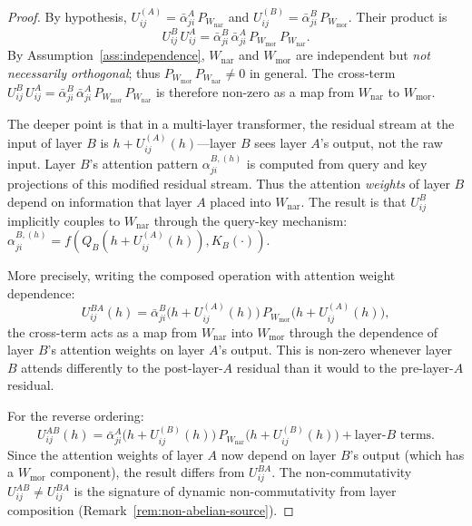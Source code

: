 \begin{proof}
By hypothesis, $U_{ij}^{(A)} = \bar{\alpha}_{ji}^{A}\, P_{W_{\mathrm{nar}}}$ and
$U_{ij}^{(B)} = \bar{\alpha}_{ji}^{B}\, P_{W_{\mathrm{mor}}}$. Their product is
\[
    U_{ij}^{B}\, U_{ij}^{A}
    = \bar{\alpha}_{ji}^{B}\, \bar{\alpha}_{ji}^{A}\, P_{W_{\mathrm{mor}}}\,
      P_{W_{\mathrm{nar}}}.
\]
By Assumption~\ref{ass:independence}, $W_{\mathrm{nar}}$ and $W_{\mathrm{mor}}$ are
independent but \emph{not necessarily orthogonal}; thus $P_{W_{\mathrm{mor}}}\,
P_{W_{\mathrm{nar}}} \neq 0$ in general. The cross-term $U_{ij}^{B}\, U_{ij}^{A} =
\bar{\alpha}_{ji}^{B}\, \bar{\alpha}_{ji}^{A}\, P_{W_{\mathrm{mor}}}\, P_{W_{\mathrm{nar}}}$
is therefore non-zero as a map from $W_{\mathrm{nar}}$ to $W_{\mathrm{mor}}$.

The deeper point is that in a multi-layer transformer, the residual stream at the input of
layer $B$ is $h + U_{ij}^{(A)}(h)$---layer $B$ sees layer $A$'s output, not the raw
input. Layer $B$'s attention pattern $\alpha_{ji}^{B,(h)}$ is computed from query and key
projections of this modified residual stream. Thus the attention \emph{weights} of layer
$B$ depend on information that layer $A$ placed into $W_{\mathrm{nar}}$. The result is
that $U_{ij}^{B}$ implicitly couples to $W_{\mathrm{nar}}$ through the query-key
mechanism: $\alpha_{ji}^{B,(h)} = f(Q_B(h + U_{ij}^{(A)}(h)), K_B(\cdot))$.

More precisely, writing the composed operation with attention weight dependence:
\[
    U_{ij}^{BA}(h) = \bar{\alpha}_{ji}^{B}\!\big(h + U_{ij}^{(A)}(h)\big)\,
    P_{W_{\mathrm{mor}}}\big(h + U_{ij}^{(A)}(h)\big),
\]
the cross-term acts as a map from $W_{\mathrm{nar}}$ into $W_{\mathrm{mor}}$ through the
dependence of layer $B$'s attention weights on layer $A$'s output. This is non-zero
whenever layer $B$ attends differently to the post-layer-$A$ residual than it would to
the pre-layer-$A$ residual.

For the reverse ordering:
\[
    U_{ij}^{AB}(h) = \bar{\alpha}_{ji}^{A}\!\big(h + U_{ij}^{(B)}(h)\big)\,
    P_{W_{\mathrm{nar}}}\big(h + U_{ij}^{(B)}(h)\big)
    + \text{layer-}B\text{ terms}.
\]
Since the attention weights of layer $A$ now depend on layer $B$'s output (which has a
$W_{\mathrm{mor}}$ component), the result differs from $U_{ij}^{BA}$. The non-commutativity
$U_{ij}^{AB} \neq U_{ij}^{BA}$ is the signature of dynamic non-commutativity from layer
composition (Remark~\ref{rem:non-abelian-source}).
\end{proof}

